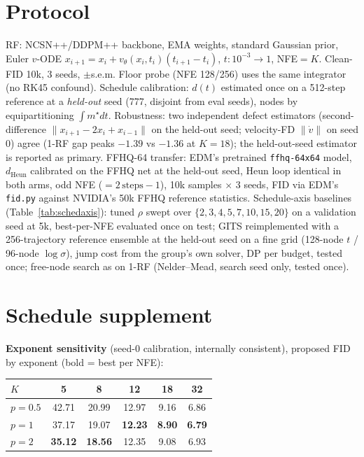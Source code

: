 \documentclass[11pt]{article}
\newcommand{\norm}[1]{\lVert #1 \rVert}
\begin{document}
\appendix
\section{Protocol}
\label{app:protocol}
RF: NCSN++/DDPM++ backbone, EMA weights, standard Gaussian prior, Euler
$v$-ODE $x_{i+1}=x_i+v_\theta(x_i,t_i)(t_{i+1}-t_i)$, $t:10^{-3}\!\to\!1$,
NFE${}=K$. Clean-FID 10k, 3 seeds, $\pm$s.e.m. Floor probe (NFE 128/256)
uses the same integrator (no RK45 confound). Schedule calibration: $d(t)$
estimated once on a 512-step reference at a \emph{held-out} seed (777,
disjoint from eval seeds), nodes by equipartitioning $\int m^\star dt$.
Robustness: two independent defect estimators (second-difference
$\norm{x_{i+1}-2x_i+x_{i-1}}$ on the held-out seed; velocity-FD
$\norm{\dot v}$ on seed 0) agree (1-RF gap peaks $-1.39$ vs $-1.36$ at
$K\!=\!18$); the held-out-seed estimator is reported as primary.
FFHQ-64 transfer: EDM's pretrained \texttt{ffhq-64x64} model, $d_{\mathrm{Heun}}$
calibrated on the FFHQ net at the held-out seed, Heun loop identical in both
arms, odd NFE ($=2\,\mathrm{steps}-1$), 10k samples $\times$ 3 seeds, FID via
EDM's \texttt{fid.py} against NVIDIA's 50k FFHQ reference statistics.
Schedule-axis baselines (Table~\ref{tab:schedaxis}): tuned $\rho$ swept over
$\{2,3,4,5,7,10,15,20\}$ on a validation seed at 5k, best-per-NFE evaluated
once on test; GITS reimplemented with a 256-trajectory reference ensemble at
the held-out seed on a fine grid (128-node $t$ / 96-node $\log\sigma$), jump
cost from the group's own solver, DP per budget, tested once; free-node
search as on 1-RF (Nelder--Mead, search seed only, tested once).

\section{Schedule supplement}
\label{app:sched}
\textbf{Exponent sensitivity} (seed-0 calibration, internally consistent),
proposed FID by exponent (bold = best per NFE):

\begin{center}\small
\begin{tabular}{lccccc}
\toprule
$K$ & 5 & 8 & 12 & 18 & 32\\
\midrule
$p\!=\!0.5$ & 42.71 & 20.99 & 12.97 & 9.16 & 6.86\\
$p\!=\!1$   & 37.17 & 19.07 & \textbf{12.23} & \textbf{8.90} & \textbf{6.79}\\
$p\!=\!2$   & \textbf{35.12} & \textbf{18.56} & 12.35 & 9.08 & 6.93\\
\bottomrule
\end{tabular}
\end{center}
\end{document}

